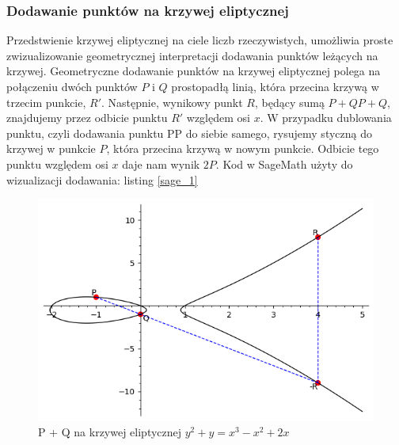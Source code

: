 \subsubsection{Dodawanie punktów na krzywej eliptycznej}
Przedstwienie krzywej eliptycznej na ciele liczb rzeczywistych,
umożliwia proste zwizualizowanie geometrycznej interpretacji dodawania punktów
leżących na krzywej.
\newline
\indent
Geometryczne dodawanie punktów na krzywej eliptycznej polega na połączeniu
dwóch punktów $P$ i $Q$ prostopadłą linią, która przecina krzywą w trzecim
punkcie, $R'$. Następnie, wynikowy punkt $R$, będący sumą $P+QP+Q$, znajdujemy przez
odbicie punktu $R'$ względem osi $x$. W przypadku dublowania punktu, czyli dodawania
punktu PP do siebie samego, rysujemy styczną do krzywej w punkcie $P$, która przecina
krzywą w nowym punkcie. Odbicie tego punktu względem osi $x$ daje nam wynik $2P$.
\newline
Kod w SageMath użyty do wizualizacji dodawania: listing \ref*{sage_1}
\begin{figure}[!h]
    \centering \includegraphics[width=0.8\linewidth]{sage/elliptic_rational_point_addition.png}
    \caption{P + Q na krzywej eliptycznej $y^2+y=x^3-x^2+2x$}
\end{figure}
\newpage

